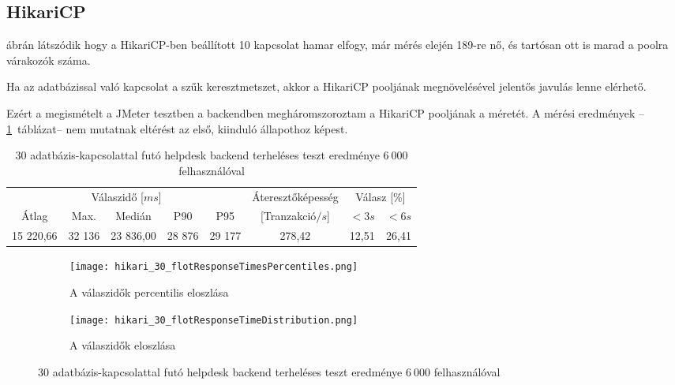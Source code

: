 \subsection{HikariCP}\label{sec:hikari}
 ábrán látszódik hogy a HikariCP-ben beállított 10 kapcsolat hamar elfogy, már mérés elején 189-re nő, és tartósan ott is marad a poolra várakozók száma.

Ha az adatbázissal való kapcsolat a szűk keresztmetszet, akkor a HikariCP pooljának megnövelésével jelentős javulás lenne elérhető.

Ezért a megismételt a JMeter tesztben a backendben megháromszoroztam a HikariCP pooljának a méretét. A mérési eredmények --\ref{tabl:hikari_30}~táblázat-- nem mutatnak eltérést az első, kiinduló állapothoz képest.

\begin{table}[hbt]
	\begin{tabular}{ccccc|c|cc}
		\multicolumn{5}{c|}{Válaszidő [$ms$]}  & Áteresztőképesség & \multicolumn{2}{c}{Válasz [\%]}	\\
		Átlag & Max. & Medián & P90 & P95 &	[Tranzakció$/s$] & $<3s$& $<6s$ \\
		\hline 
		15 220,66 & 32 136 & 23 836,00 & 28 876 & 29 177 & 278,42 & 12,51 & 26,41 \\
	\end{tabular} 
	\caption{30 adatbázis-kapcsolattal futó helpdesk backend terheléses teszt eredménye $6~000$ felhasználóval}
	\label{tabl:hikari_30}
\end{table}



\begin{figure}[hbt]
	\begin{subfigure}{.49\textwidth}
		\centering
		\texttt{[image: hikari\_30\_flotResponseTimesPercentiles.png]}  
		\caption{A válaszidők percentilis eloszlása}
	\end{subfigure}
	\begin{subfigure}{.49\textwidth}
		\centering
		\texttt{[image: hikari\_30\_flotResponseTimeDistribution.png]}  
		\caption{A válaszidők eloszlása}
	\end{subfigure}
	
	\caption[Helpdesk backend terheléses teszt módosított HikariCp beállításokkal]{30 adatbázis-kapcsolattal futó helpdesk backend terheléses teszt eredménye $6~000$ felhasználóval}
\end{figure}


